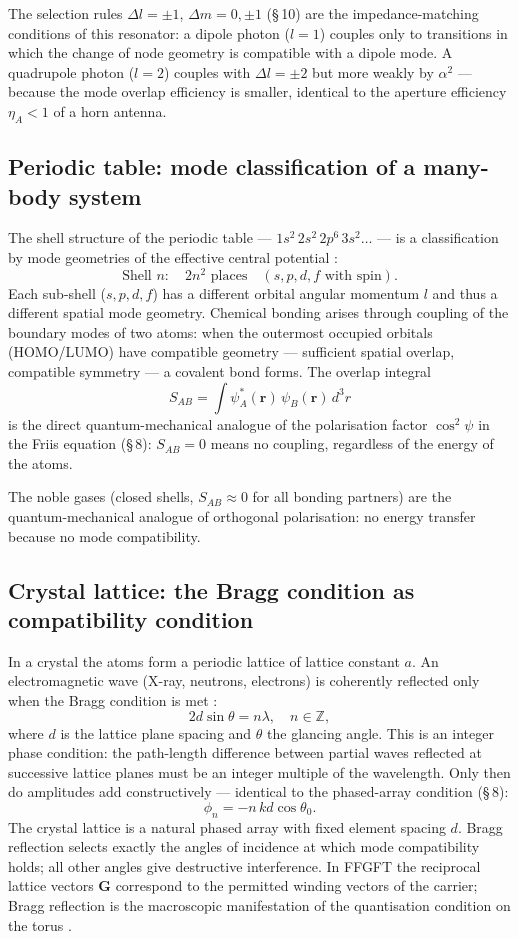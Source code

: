 The selection rules $\Delta l = \pm 1$, $\Delta m = 0,\pm 1$ (\S\,10) are
the impedance-matching conditions of this resonator: a dipole photon ($l=1$)
couples only to transitions in which the change of node geometry is
compatible with a dipole mode. A quadrupole photon ($l=2$) couples with
$\Delta l = \pm 2$ but more weakly by $\alpha^2$ --- because the mode
overlap efficiency is smaller, identical to the aperture efficiency
$\eta_A < 1$ of a horn antenna.

\subsection*{Periodic table: mode classification of a many-body system}

The shell structure of the periodic table --- $1s^2\,2s^2\,2p^6\,3s^2\ldots$
--- is a classification by mode geometries of the effective central
potential \EM:
\[
  \text{Shell } n: \quad 2n^2 \text{ places}
  \quad (s, p, d, f \text{ with spin}).
\]
Each sub-shell ($s, p, d, f$) has a different orbital angular momentum $l$
and thus a different spatial mode geometry. Chemical bonding arises through
coupling of the boundary modes of two atoms: when the outermost occupied
orbitals (HOMO/LUMO) have compatible geometry --- sufficient spatial
overlap, compatible symmetry --- a covalent bond forms. The overlap integral
\[
  S_{AB} = \int \psi_A^*(\mathbf{r})\,\psi_B(\mathbf{r})\,d^3r
\]
is the direct quantum-mechanical analogue of the polarisation factor
$\cos^2\psi$ in the Friis equation (\S\,8): $S_{AB}=0$ means no coupling,
regardless of the energy of the atoms.

The noble gases (closed shells, $S_{AB}\approx 0$ for all bonding partners)
are the quantum-mechanical analogue of orthogonal polarisation: no energy
transfer because no mode compatibility.

\subsection*{Crystal lattice: the Bragg condition as compatibility condition}

In a crystal the atoms form a periodic lattice of lattice constant $a$.
An electromagnetic wave (X-ray, neutrons, electrons) is coherently reflected
only when the Bragg condition is met \cite{Kittel2005,Ashcroft1976}:
\[
  2d\sin\theta = n\lambda, \quad n \in \mathbb{Z},
\]
where $d$ is the lattice plane spacing and $\theta$ the glancing angle.
This is an integer phase condition: the path-length difference between
partial waves reflected at successive lattice planes must be an integer
multiple of the wavelength. Only then do amplitudes add constructively ---
identical to the phased-array condition (\S\,8):
\[
  \phi_n = -n\,kd\cos\theta_0.
\]
The crystal lattice is a natural phased array with fixed element spacing
$d$. Bragg reflection selects exactly the angles of incidence at which mode
compatibility holds; all other angles give destructive interference. In
FFGFT the reciprocal lattice vectors $\mathbf{G}$ correspond to the
permitted winding vectors of the carrier; Bragg reflection is the
macroscopic manifestation of the quantisation condition on the torus \SM.

